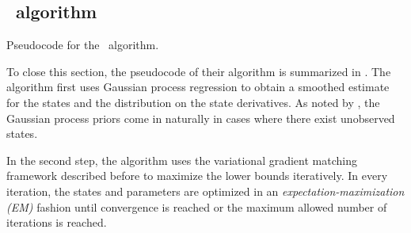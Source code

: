 \subsection*{\algovgmgp\ algorithm}

\begin{algorithm}
    \centering
    \caption{Pseudocode for the \algovgmgp\ algorithm.}
    \label{algo-vgmgp}
    \begin{algorithmic}[1]
            \State 
        \EndFor
        \State
                \State 
            \EndFor                
            
            \State 
        \EndWhile
    \end{algorithmic}
\end{algorithm}

To close this section, the pseudocode of their algorithm is summarized in .
The algorithm first uses Gaussian process regression to obtain a smoothed estimate for the states and the distribution on the state derivatives.
As noted by \cite{gorbach2017scalable}, the Gaussian process priors come in naturally in cases where there exist unobserved states.

In the second step, the algorithm uses the variational gradient matching framework described before to maximize the lower bounds iteratively.
In every iteration, the states and parameters are optimized in an \emph{expectation-maximization (EM)} \cite[]{bishop2006pattern} fashion until convergence is reached or the maximum allowed number of iterations is reached.



